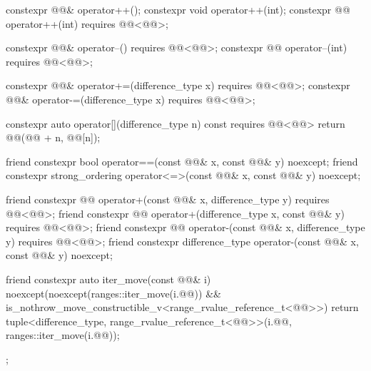 \begin{codeblock}
{{    constexpr @@& operator++();
    constexpr void operator++(int);
    constexpr @@ operator++(int) requires @@<@@>;

    constexpr @@& operator--() requires @@<@@>;
    constexpr @@ operator--(int) requires @@<@@>;

    constexpr @@& operator+=(difference_type x)
      requires @@<@@>;
    constexpr @@& operator-=(difference_type x)
      requires @@<@@>;

    constexpr auto operator[](difference_type n) const
      requires @@<@@>
    { return @@(@@ + n, @@[n]); }

    friend constexpr bool operator==(const @@& x, const @@& y) noexcept;
    friend constexpr strong_ordering operator<=>(const @@& x, const @@& y) noexcept;

    friend constexpr @@ operator+(const @@& x, difference_type y)
      requires @@<@@>;
    friend constexpr @@ operator+(difference_type x, const @@& y)
      requires @@<@@>;
    friend constexpr @@ operator-(const @@& x, difference_type y)
      requires @@<@@>;
    friend constexpr difference_type operator-(const @@& x, const @@& y) noexcept;

    friend constexpr auto iter_move(const @@& i)
      noexcept(noexcept(ranges::iter_move(i.@@)) &&
               is_nothrow_move_constructible_v<range_rvalue_reference_t<@@>>) {
      return tuple<difference_type,
                   range_rvalue_reference_t<@@>>(i.@@, ranges::iter_move(i.@@));
    }
  };
}
\end{codeblock}

